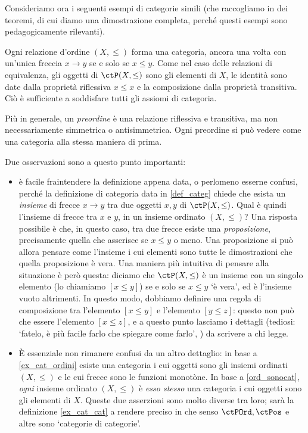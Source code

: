 Consideriamo ora i seguenti esempi di categorie simili (che raccogliamo in dei teoremi, di cui diamo una dimostrazione completa, perché questi esempi sono pedagogicamente rilevanti).
\begin{examples}\label{ord_sonocat}
 Ogni relazione d'ordine \((X,\le)\) forma una categoria, ancora una volta con un'unica freccia \(x\to y\) se e solo se \(x\le y\). Come nel caso delle relazioni di equivalenza, gli oggetti di \(\ctP(X,\le)\) sono gli elementi di \(X\), le identità sono date dalla proprietà riflessiva \(x\le x\) e la composizione dalla proprietà transitiva. Ciò è sufficiente a soddisfare tutti gli assiomi di categoria.

 Più in generale, un \emph{preordine} è una relazione riflessiva e transitiva, ma non necessariamente simmetrica o antisimmetrica. Ogni preordine si può vedere come una categoria alla stessa maniera di prima.
\end{examples}
\begin{remark}\label{ord_sonocat_maenriched}
 Due osservazioni sono a questo punto importanti:
 \begin{itemize}
  \item è facile fraintendere la definizione appena data, o perlomeno esserne confusi, perché la definizione di categoria data in \ref{def_categ} chiede che esista un \emph{insieme} di frecce \(x\to y\) tra due oggetti \(x,y\) di \(\ctP(X,\le)\). Qual è quindi l'insieme di frecce tra \(x\) e \(y\), in un insieme ordinato \((X,\le)\)? Una risposta possibile è che, in questo caso, tra due frecce esiste una \emph{proposizione}, precisamente quella che asserisce se \(x\le y\) o meno. Una proposizione si può allora pensare come l'insieme i cui elementi sono tutte le dimostrazioni che quella proposizione è vera. Una maniera più intuitiva di pensare alla situazione è però questa: diciamo che \(\ctP(X,\le)\) è un insieme con un singolo elemento (lo chiamiamo \([x\le y]\)) se e solo se \(x\le y\) `è vera', ed è l'insieme vuoto altrimenti. In questo modo, dobbiamo definire una regola di composizione tra l'elemento \([x\le y]\) e l'elemento \([y\le z]\): questo non può che essere l'elemento \([x\le z]\), e a questo punto lasciamo i dettagli (tediosi: `fatelo, è più facile farlo che spiegare come farlo', \cite{zee2010quantum}) da scrivere a chi legge.
  \item È essenziale non rimanere confusi da un altro dettaglio: in base a \ref{ex_cat_ordini} esiste una categoria i cui oggetti sono gli insiemi ordinati \((X,\le)\) e le cui frecce sono le funzioni monotòne. In base a \ref{ord_sonocat}, \emph{ogni} insieme ordinato \((X,\le)\) è \emph{esso stesso} una categoria i cui oggetti sono gli elementi di \(X\). Queste due asserzioni sono molto diverse tra loro; sarà la definizione \ref{ex_cat_cat} a rendere preciso in che senso \(\ctPOrd,\ctPos\) e altre sono `categorie di categorie'.
 \end{itemize}
\end{remark}
